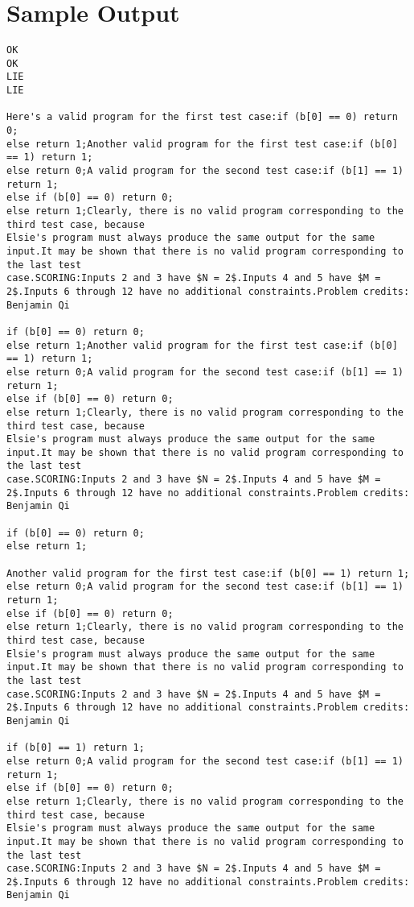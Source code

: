 \documentclass[12pt]{article}
\begin{document}
\section*{Sample Output}
\begin{verbatim}
OK
OK
LIE
LIE

Here's a valid program for the first test case:if (b[0] == 0) return 0;
else return 1;Another valid program for the first test case:if (b[0] == 1) return 1;
else return 0;A valid program for the second test case:if (b[1] == 1) return 1;
else if (b[0] == 0) return 0;
else return 1;Clearly, there is no valid program corresponding to the third test case, because
Elsie's program must always produce the same output for the same input.It may be shown that there is no valid program corresponding to the last test
case.SCORING:Inputs 2 and 3 have $N = 2$.Inputs 4 and 5 have $M = 2$.Inputs 6 through 12 have no additional constraints.Problem credits: Benjamin Qi

if (b[0] == 0) return 0;
else return 1;Another valid program for the first test case:if (b[0] == 1) return 1;
else return 0;A valid program for the second test case:if (b[1] == 1) return 1;
else if (b[0] == 0) return 0;
else return 1;Clearly, there is no valid program corresponding to the third test case, because
Elsie's program must always produce the same output for the same input.It may be shown that there is no valid program corresponding to the last test
case.SCORING:Inputs 2 and 3 have $N = 2$.Inputs 4 and 5 have $M = 2$.Inputs 6 through 12 have no additional constraints.Problem credits: Benjamin Qi

if (b[0] == 0) return 0;
else return 1;

Another valid program for the first test case:if (b[0] == 1) return 1;
else return 0;A valid program for the second test case:if (b[1] == 1) return 1;
else if (b[0] == 0) return 0;
else return 1;Clearly, there is no valid program corresponding to the third test case, because
Elsie's program must always produce the same output for the same input.It may be shown that there is no valid program corresponding to the last test
case.SCORING:Inputs 2 and 3 have $N = 2$.Inputs 4 and 5 have $M = 2$.Inputs 6 through 12 have no additional constraints.Problem credits: Benjamin Qi

if (b[0] == 1) return 1;
else return 0;A valid program for the second test case:if (b[1] == 1) return 1;
else if (b[0] == 0) return 0;
else return 1;Clearly, there is no valid program corresponding to the third test case, because
Elsie's program must always produce the same output for the same input.It may be shown that there is no valid program corresponding to the last test
case.SCORING:Inputs 2 and 3 have $N = 2$.Inputs 4 and 5 have $M = 2$.Inputs 6 through 12 have no additional constraints.Problem credits: Benjamin Qi


\end{verbatim}
\end{document}
